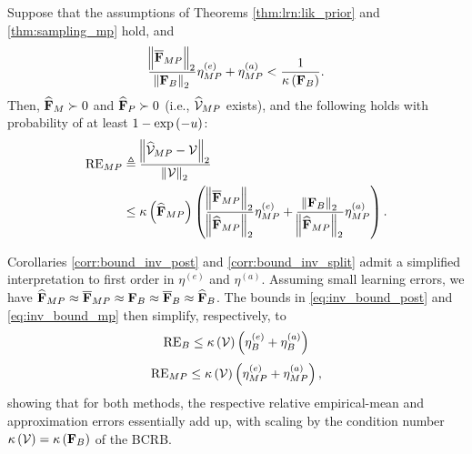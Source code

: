 {%
\begin{corollary}\label{corr:bound_inv_split}
Suppose that %
the assumptions of Theorems {\ref{thm:lrn:lik_prior} and} \ref{thm:sampling_mp} hold,
{and 
\begin{equation}\label{eq:inv_cond_mp}
    \frac{\norm{\overline{\mathbf{F}}_{MP}}_2}{\norm{\mathbf{F}_{B}}_2} \eta_{MP}^{(e)} +\eta_{MP}^{(a)}<\frac{1}{\kappa\left(\mathbf{F}_{B}\right)}.
\end{equation}
Then,  
}
{$\widehat{\mathbf{F}}_{M}\succ 0$ and $\widehat{\mathbf{F}}_{P}\succ 0$} {(i.e., %
$\widehat{\mathcal{V}}_{MP}$ exists)}, {and} the following
holds with probability {of at least} $1-\exp\left(-u\right)$:
\begin{align}\label{eq:inv_bound_mp}
\mathrm{RE}_{MP} & \triangleq\frac{\norm{\widehat{\mathcal{V}}_{MP}-\mathcal{V}}_2}{\norm{\mathcal{V}}_2} \nonumber \\
&\leq\kappa\left(\widehat{\mathbf{F}}_{MP}\right)\left(\frac{\norm{\overline{\mathbf{F}}_{MP}}_2}{\norm{\widehat{\mathbf{F}}_{MP}}_2} \eta_{MP}^{(e)}+\frac{\norm{\mathbf{F}_{B}}_2}{\norm{\widehat{\mathbf{F}}_{MP}}_2}\eta_{MP}^{(a)}\right).
\end{align}
\end{corollary}
%
{Corollaries \ref{corr:bound_inv_post} and \ref{corr:bound_inv_split} admit a simplified interpretation to first order in $\eta^{(e)}$ and $\eta^{(a)}$. Assuming small learning errors, we have $\widehat{\mathbf{F}}_{MP} \approx \overline{\mathbf{F}}_{MP} \approx\mathbf{F}_{B} \approx\overline{\mathbf{F}}_{B}  \approx  \widehat{\mathbf{F}}_{B}$. The bounds in \eqref{eq:inv_bound_post} and \eqref{eq:inv_bound_mp} then simplify, respectively, to
\begin{equation}
   \mathrm{RE}_{B} \leq\kappa\left(\mathcal{V}\right)\left(
    \eta_{B}^{(e)}+\eta_{B}^{(a)}\right) 
\end{equation}
\begin{equation}
   \mathrm{RE}_{MP} \leq\kappa\left(\mathcal{V}\right)\left(
    \eta_{MP}^{(e)}+\eta_{MP}^{(a)}\right), 
\end{equation}
showing that for both methods, the respective relative empirical-mean and approximation errors essentially add up, with scaling by the condition number $\kappa\left(\mathcal{V}\right) = \kappa\left(\mathbf{F}_{B}\right)$ of the BCRB. 
}

}
